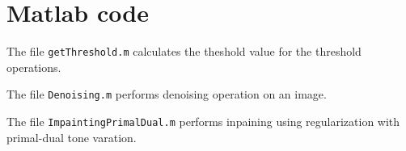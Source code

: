 \documentclass[a4paper,12pt]{article}
\begin{document}
\FloatBarrier
\section{Matlab code}
The file \texttt{getThreshold.m} calculates the theshold value for the threshold operations.


\vspace{18pt}
\noindent The file \texttt{Denoising.m} performs denoising operation on an image.


\vspace{18pt} 
\noindent The file \texttt{ImpaintingPrimalDual.m} performs inpaining using regularization with primal-dual tone varation.

\end{document}
